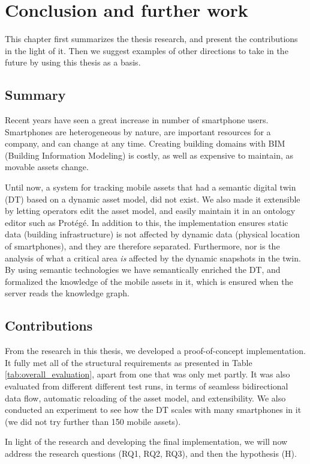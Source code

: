 \documentclass{article}
\begin{document}
\newpage
\section{Conclusion and further work}\label{sec:Conclusion}
This chapter first summarizes the thesis research, and present the contributions in the light of it. Then we suggest examples of other directions to take in the future by using this thesis as a basis.

\subsection{Summary}
Recent years have seen a great increase in number of smartphone users. Smartphones are heterogeneous by nature, are important resources for a company, and can change at any time. Creating building domains with BIM (Building Information Modeling) is costly, as well as expensive to maintain, as movable assets change.  

Until now, a system for tracking mobile assets that had a semantic digital twin (DT) based on a dynamic asset model, did not exist. We also made it extensible by letting operators edit the asset model, and easily maintain it in an ontology editor such as Protégé. In addition to this, the implementation ensures static data (building infrastructure) is not affected by dynamic data (physical location of smartphones), and they are therefore separated. Furthermore, nor is the analysis of what a critical area \emph{is} affected by the dynamic snapshots in the twin. By using semantic technologies we have semantically enriched the DT, and formalized the knowledge of the mobile assets in it, which is ensured when the server reads the knowledge graph.

\subsection{Contributions}
From the research in this thesis, we developed a proof-of-concept implementation. It fully met all of the structural requirements as presented in Table \ref{tab:overall_evaluation}, apart from one that was only met partly. It was also evaluated from different different test runs, in terms of seamless bidirectional data flow, automatic reloading of the asset model, and extensibility. We also conducted an experiment to see how the DT scales with many smartphones in it (we did not try further than 150 mobile assets).

In light of the research and developing the final implementation, we will now address the research questions (RQ1, RQ2, RQ3), and then the hypothesis (H).
\end{document}
